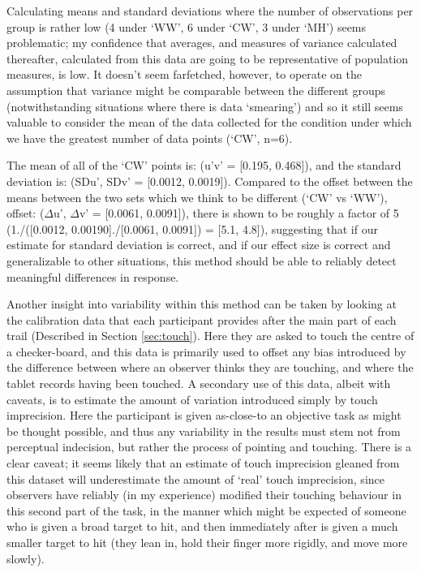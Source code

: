 Calculating means and standard deviations where the number of observations per group is rather low (4 under `WW', 6 under `CW', 3 under `MH') seems problematic; my confidence that averages, and measures of variance calculated thereafter, calculated from this data are going to be representative of population measures, is low. It doesn't seem farfetched, however, to operate on the assumption that variance might be comparable between the different groups (notwithstanding situations where there is data `smearing') and so it still seems valuable to consider the mean of the data collected for the condition under which we have the greatest number of data points (`CW', n=6).


The mean of all of the `CW' points is: (u'v' = [0.195, 0.468]), and the standard deviation is: (SDu', SDv' = [0.0012, 0.0019]). Compared to the offset between the means between the two sets which we think to be different (`CW' vs `WW'), offset: ($\Delta$u', $\Delta$v' = [0.0061, 0.0091]), there is shown to be roughly a factor of 5 (1./([0.0012, 0.00190]./[0.0061, 0.0091]) = [5.1, 4.8]), suggesting that if our estimate for standard deviation is correct, and if our effect size is correct and generalizable to other situations, this method should be able to reliably detect meaningful differences in response.

Another insight into variability within this method can be taken by looking at the calibration data that each participant provides after the main part of each trail (Described in Section \ref{sec:touch}). Here they are asked to touch the centre of a checker-board, and this data is primarily used to offset any bias introduced by the difference between where an observer thinks they are touching, and where the tablet records having been touched. A secondary use of this data, albeit with caveats, is to estimate the amount of variation introduced simply by touch imprecision. Here the participant is given as-close-to an objective task as might be thought possible, and thus any variability in the results must stem not from perceptual indecision, but rather the process of pointing and touching. There is a clear caveat; it seems likely that an estimate of touch imprecision gleaned from this dataset will underestimate the amount of `real' touch imprecision, since observers have reliably (in my experience) modified their touching behaviour in this second part of the task, in the manner which might be expected of someone who is given a broad target to hit, and then immediately after is given a much smaller target to hit (they lean in, hold their finger more rigidly, and move more slowly).

